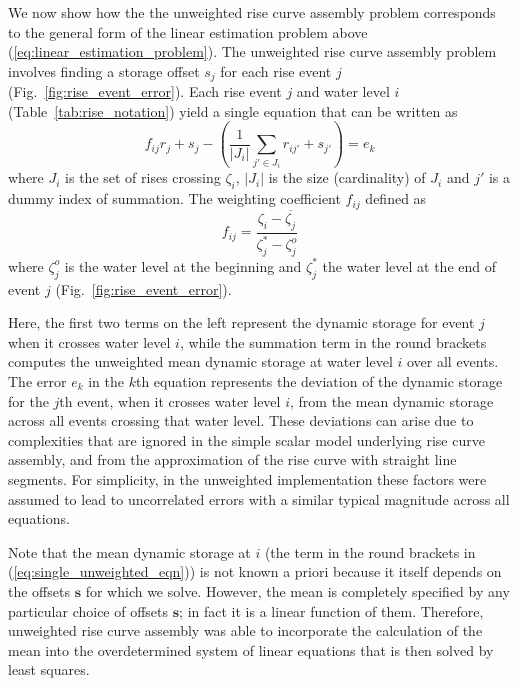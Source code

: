 \documentclass[11pt,a4paper]{article}
\renewcommand{\vec}[1]{\mathbf{#1}}
\begin{document}
We now show how the the unweighted rise curve assembly problem
\cite{Cobb_et_al_2017, Cobb_and_Harvey_2019} corresponds to the
general form of the linear estimation problem above
(\ref{eq:linear_estimation_problem}).  The unweighted rise curve
assembly problem involves finding a storage offset $s_j$ for each rise
event $j$ (Fig.~\ref{fig:rise_event_error}).  Each rise event $j$ and
water level $i$ (Table~\ref{tab:rise_notation}) yield a single
equation that can be written as
\begin{equation}
  \label{eq:single_unweighted_eqn}
  f_{ij} r_j + s_j - \left(\frac{1}{|J_i|} \sum_{j'\in J_i} r_{ij'} + s_{j'}\right) = e_k
\end{equation}
where $J_i$ is the set of rises crossing $\zeta_i$, $|J_i|$ is the
size (cardinality) of $J_i$ and $j'$ is a dummy index of summation.
The weighting coefficient $f_{ij}$ defined as
\begin{equation}
f_{ij} = \frac{\zeta_i - \overline{\zeta_j}}{\zeta_j^* - \zeta^o_j}
\end{equation}
where $\zeta^o_j$ is the water level at the beginning and $\zeta^*_j$
the water level at the end of event $j$
(Fig.~\ref{fig:rise_event_error}).

Here, the first two terms on the left represent the dynamic storage
for event $j$ when it crosses water level $i$, while the summation
term in the round brackets computes the unweighted mean dynamic
storage at water level $i$ over all events.  The error $e_k$ in the
$k$th equation represents the deviation of the dynamic storage for the
$j$th event, when it crosses water level $i$, from the mean dynamic
storage across all events crossing that water level.  These deviations
can arise due to complexities that are ignored in the simple scalar
model underlying rise curve assembly, and from the approximation of
the rise curve with straight line segments.  For simplicity, in the
unweighted implementation these factors were assumed to lead to
uncorrelated errors with a similar typical magnitude across all
equations.

Note that the mean dynamic storage at $i$ (the term in the round
brackets in (\ref{eq:single_unweighted_eqn})) is not known a priori
because it itself depends on the offsets $\vec{s}$ for which we solve.
However, the mean is completely specified by any particular choice of
offsets $\vec{s}$; in fact it is a linear function of them.
Therefore, unweighted rise curve assembly \cite{Cobb_et_al_2017,
  Cobb_and_Harvey_2019} was able to incorporate the calculation of the
mean into the overdetermined system of linear equations that is then
solved by least squares.
\end{document}
